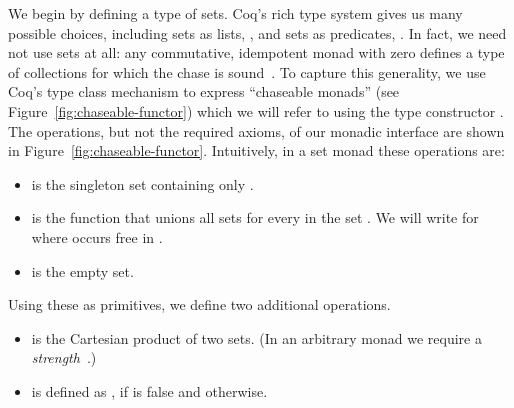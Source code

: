 \documentclass[preprint]{sigplanconf}
\newcommand{\greg}[1]{\textcolor{blue}{GREG: #1}}
\begin{document}

We begin by defining a type of sets.
 Coq's rich type system gives us many possible choices, including sets as lists, , and sets as predicates, .
In fact, we need not use sets at all: any commutative, idempotent monad with zero defines a type of collections for which the chase is sound~\cite{Popa99anequational}.
To capture this generality, we use Coq's type class mechanism to express ``chaseable monads'' (see Figure~\ref{fig:chaseable-functor}) which we will refer to using the type constructor .
The operations, but not the required axioms, of our monadic interface are shown in Figure~\ref{fig:chaseable-functor}.
Intuitively, in a set monad these operations are:
\begin{itemize}
\item {} is the singleton set containing only .
\item {} is the function that unions all sets  for every  in the set .  We will write  for  where  occurs free in .
\item {} is the empty set.
\end{itemize}
Using these as primitives, we define two additional operations.
\begin{itemize}
\item {} is the Cartesian product of two sets.  (In an arbitrary monad we require a {\it strength}~\cite{BW}.)
\item {} is defined as , if  is false and  otherwise.
\end{itemize}
\end{document}
